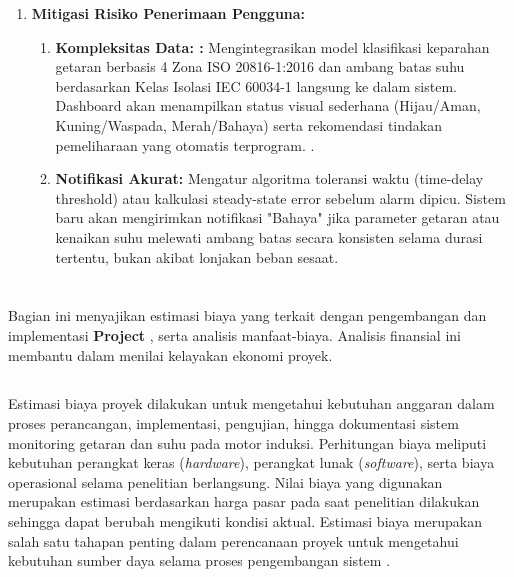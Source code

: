 \documentclass{elsinta}
\begin{document}
\begin{enumerate}
\begin{enumerate}
    \end{enumerate}
    \item \textbf{Mitigasi Risiko Penerimaan Pengguna:}
    \begin{enumerate}
        \item \textbf{Kompleksitas Data: :} Mengintegrasikan model klasifikasi keparahan getaran berbasis 4 Zona ISO 20816-1:2016 dan ambang batas suhu berdasarkan Kelas Isolasi IEC 60034-1 langsung ke dalam sistem. Dashboard akan menampilkan status visual sederhana (Hijau/Aman, Kuning/Waspada, Merah/Bahaya) serta rekomendasi tindakan pemeliharaan yang otomatis terprogram. .
        \item \textbf{Notifikasi Akurat:} Mengatur algoritma toleransi waktu (time-delay threshold) atau kalkulasi steady-state error sebelum alarm dipicu. Sistem baru akan mengirimkan notifikasi "Bahaya" jika parameter getaran atau kenaikan suhu melewati ambang batas secara konsisten selama durasi tertentu, bukan akibat lonjakan beban sesaat. 
 
    \end{enumerate}
\end{enumerate}


\newpage
\section{\FinancialAnalysisTitle}

Bagian ini menyajikan estimasi biaya yang terkait dengan pengembangan dan implementasi \textbf{Project }, serta analisis manfaat-biaya. Analisis finansial ini membantu dalam menilai kelayakan ekonomi proyek.

\subsection{\CostEstimationTitle}
Estimasi biaya proyek dilakukan untuk mengetahui kebutuhan anggaran dalam proses perancangan, implementasi, pengujian, hingga dokumentasi sistem monitoring getaran dan suhu pada motor induksi. Perhitungan biaya meliputi kebutuhan perangkat keras (\textit{hardware}), perangkat lunak (\textit{software}), serta biaya operasional selama penelitian berlangsung. Nilai biaya yang digunakan merupakan estimasi berdasarkan harga pasar pada saat penelitian dilakukan sehingga dapat berubah mengikuti kondisi aktual. Estimasi biaya merupakan salah satu tahapan penting dalam perencanaan proyek untuk mengetahui kebutuhan sumber daya selama proses pengembangan sistem \cite{PMBOK,kerzner2022}.
\end{document}
